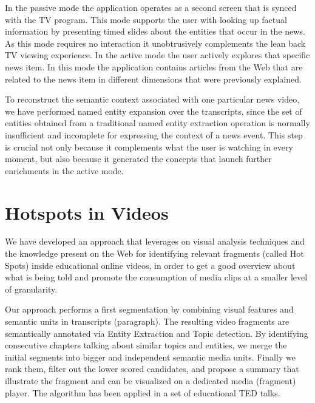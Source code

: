 \documentclass[a4paper,11pt]{report}
\begin{document}
In the passive mode the application operates as a second screen that is synced with the TV program. This mode supports the user with looking up factual information by presenting timed slides about the entities that occur in the news. As this mode requires no interaction it unobtrusively complements the lean back TV viewing experience. In the active mode the user actively explores that specific news item. In this mode the application contains articles from the Web that are related to the news item in different dimensions that were previously explained.

To reconstruct the semantic context associated with one particular news video, we have performed named entity expansion over the transcripts, since the set of entities obtained from a traditional named entity extraction operation is normally insufficient and incomplete for expressing the context of a news event. This step is crucial not only because it complements what the user is watching in every moment, but also because it generated the concepts that launch further enrichments in the active mode.

\section{Hotspots in Videos}
\label{hotspots}
We have developed an approach that leverages on visual analysis techniques and the knowledge present on the Web for identifying relevant fragments (called Hot Spots) inside educational online videos, in order to get a good overview about what is being told and promote the consumption of media clips at a smaller level of granularity.

Our approach performs a first segmentation by combining visual features and semantic units in transcripts (paragraph). The resulting video fragments are semantically annotated via Entity Extraction and Topic detection. By identifying consecutive chapters talking about similar topics and entities, we merge the initial segments into bigger and independent semantic media units. Finally we rank them, filter out the lower scored candidates, and propose a summary that illustrate the fragment and can be visualized on a dedicated media (fragment) player. The algorithm has been applied in a set of educational TED talks.
\end{document}

